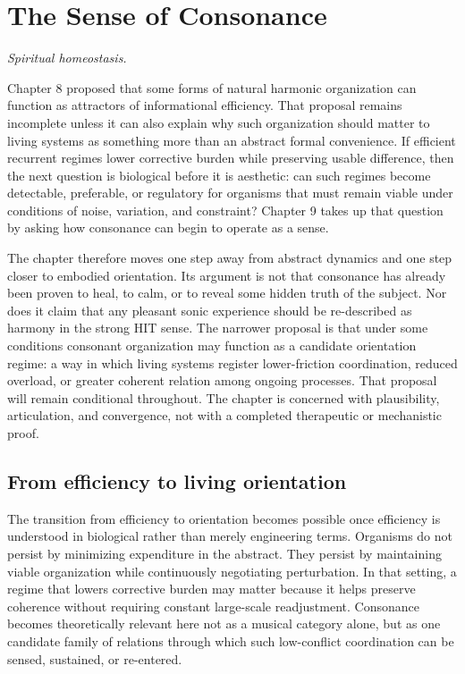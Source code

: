 \chapter{The Sense of Consonance}

\epigraph{\emph{Spiritual homeostasis.}}{}

Chapter 8 proposed that some forms of natural harmonic organization can function as attractors of informational efficiency. That proposal remains incomplete unless it can also explain why such organization should matter to living systems as something more than an abstract formal convenience. If efficient recurrent regimes lower corrective burden while preserving usable difference, then the next question is biological before it is aesthetic: can such regimes become detectable, preferable, or regulatory for organisms that must remain viable under conditions of noise, variation, and constraint? Chapter 9 takes up that question by asking how consonance can begin to operate as a sense.

The chapter therefore moves one step away from abstract dynamics and one step closer to embodied orientation. Its argument is not that consonance has already been proven to heal, to calm, or to reveal some hidden truth of the subject. Nor does it claim that any pleasant sonic experience should be re-described as harmony in the strong HIT sense. The narrower proposal is that under some conditions consonant organization may function as a candidate orientation regime: a way in which living systems register lower-friction coordination, reduced overload, or greater coherent relation among ongoing processes. That proposal will remain conditional throughout. The chapter is concerned with plausibility, articulation, and convergence, not with a completed therapeutic or mechanistic proof.

\section{From efficiency to living orientation}

The transition from efficiency to orientation becomes possible once efficiency is understood in biological rather than merely engineering terms. Organisms do not persist by minimizing expenditure in the abstract. They persist by maintaining viable organization while continuously negotiating perturbation. In that setting, a regime that lowers corrective burden may matter because it helps preserve coherence without requiring constant large-scale readjustment. Consonance becomes theoretically relevant here not as a musical category alone, but as one candidate family of relations through which such low-conflict coordination can be sensed, sustained, or re-entered.

